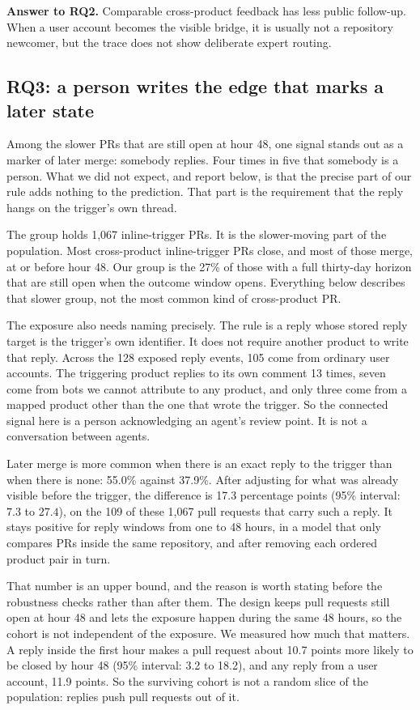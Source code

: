 \documentclass[lineno,pdflatex,sn-basic]{sn-jnl}
\begin{document}
\noindent\textbf{Answer to RQ2.} Comparable cross-product feedback has less
public follow-up. When a user account becomes the visible bridge, it is usually
not a repository newcomer, but the trace does not show deliberate expert
routing.

\FloatBarrier
\subsection{RQ3: a person writes the edge that marks a later state}

Among the slower PRs that are still open at hour 48, one signal stands out as a
marker of later merge: somebody replies. Four times in five that somebody is a
person. What we did not expect, and report below, is that the precise part of our rule adds nothing to the prediction. That part is the
requirement that the reply hangs on the trigger's own thread.

The group holds 1,067 inline-trigger PRs. It is the slower-moving part of the
population. Most cross-product inline-trigger PRs close, and most of those
merge, at or before hour 48. Our group is the 27\% of those with a full thirty-day horizon that are still
open when
the outcome window opens. Everything below describes that slower group, not
the most common kind of cross-product PR.

The exposure also needs naming precisely. The rule is a reply whose stored reply
target is the trigger's own identifier. It does not require another
product to write that reply. Across the 128 exposed reply events, 105 come from ordinary user accounts. The
triggering product replies to its own comment 13 times, seven come from bots we
cannot attribute to any product, and only three come from a mapped product other
than the one that wrote the trigger. So the connected
signal here is a person acknowledging an agent's review point. It is not a
conversation between agents.

Later merge is more common when there is an exact reply to the trigger than when
there is none: 55.0\% against 37.9\%. After adjusting for what was already
visible before the trigger, the difference is 17.3 percentage points (95\%
interval: $7.3$ to $27.4$), on the 109 of these 1,067 pull requests that carry
such a reply.
It stays positive for reply windows from one to 48 hours, in a model that only
compares PRs inside the same repository, and after removing each ordered product
pair in turn.

That number is an upper bound, and the reason is worth stating before the
robustness checks rather than after them. The design keeps pull requests still
open at hour 48 and lets the exposure happen during the same 48 hours, so the
cohort is not independent of the exposure. We measured how much that matters. A
reply inside the first hour makes a pull request about 10.7 points more likely
to be closed by hour 48 (95\% interval: 3.2 to 18.2), and any reply from a user
account, 11.9 points. So the surviving cohort is not a random slice of the
population: replies push pull requests out of it.
\end{document}
